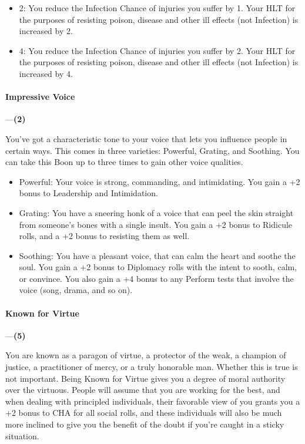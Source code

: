 \documentclass[oneside,11pt,english]{book}
\begin{document}
\begin{itemize}
\item 2: You reduce the Infection Chance of injuries you suffer by 1. Your HLT for the purposes of resisting 
poison, disease and other ill effects (not Infection) is increased by 2. 
\item 4: You reduce the Infection Chance of injuries you suffer by 2. Your HLT for the purposes of resisting 
poison, disease and other ill effects (not Infection) is increased by 4. 
\end{itemize}
\paragraph{\label{boon:Impressive Voice}Impressive Voice}---\quad\textbf{(2)}\par
You've got a characteristic tone to your voice that lets you influence people in certain ways. This comes 
in three varieties: Powerful, Grating, and Soothing. You can take this Boon up to three times to gain other 
voice qualities. 

\begin{itemize}
\item Powerful: Your voice is strong, commanding, and intimidating. You gain a +2 bonus to Leadership and 
Intimidation. 
\item Grating: You have a sneering honk of a voice that can peel the skin straight from someone's bones with a 
single insult. You gain a +2 bonus to Ridicule rolls, and a +2 bonus to resisting them as well. 
\item Soothing: You have a pleasant voice, that can calm the heart and soothe the soul. You gain a +2 bonus to 
Diplomacy rolls with the intent to sooth, calm, or convince. You also gain a +4 bonus to any Perform 
tests that involve the voice (song, drama, and so on). 
\end{itemize}
\paragraph{\label{boon:Known for Virtue}Known for Virtue}---\quad\textbf{(5)}\par
You are known as a paragon of virtue, a protector of the weak, a champion of justice, a practitioner of 
mercy, or a truly honorable man. Whether this is true is not important. Being Known for Virtue gives you 
a degree of moral authority over the virtuous. People will assume that you are working for the best, and 
when dealing with principled individuals, their favorable view of you grants you a +2 bonus to CHA for 
all social rolls, and these individuals will also be much more inclined to give you the benefit of the doubt 
if you're caught in a sticky situation. 
\end{document}
